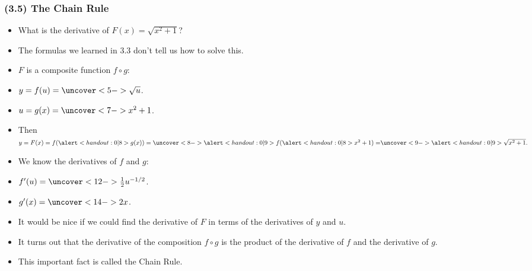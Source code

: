 \begin{frame}
\frametitle{(3.5) The Chain Rule}
\begin{itemize}
\item  What is the derivative of $F(x) = \sqrt{x^2 + 1}$?
\item<2->  The formulas we learned in 3.3 don't tell us how to solve this.
\item<3->  $F$ is a composite function $f\circ g$:
\item<3-| alert@4-5,9,11-12>  $y = f(u) = \uncover<5->{\sqrt{u}}$.
\item<3-| alert@6-8,13-14>  $u = g(x) = \uncover<7->{x^2+1}$.
\item<3->  Then $y = F(x) = f(\alert<handout:0| 8>{g(x)}) = \uncover<8->{\alert<handout:0| 9>{f(\alert<handout:0| 8>{x^2+1}) =}}  \uncover<9->{\alert<handout:0| 9>{\sqrt{x^2+1}}.}$
\item<10->  We know the derivatives of $f$ and $g$:
\item<10-| alert@11-12>  $f'(u) = \uncover<12->{\frac{1}{2}u^{-1/2}}$.
\item<10-| alert@13-14>  $g'(x) = \uncover<14->{2x}$.
\item<15->  It would be nice if we could find the derivative of $F$ in terms of the derivatives of $y$ and $u$.
\item<16->  It turns out that the derivative of the composition $f\circ g$ is the product of the derivative of $f$ and the derivative of $g$.
\item<17->  This important fact is called the Chain Rule.
\end{itemize}
\end{frame}
